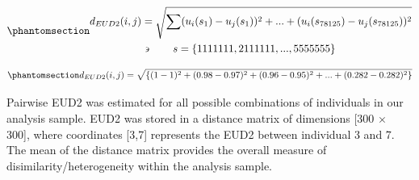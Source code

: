 \documentclass[
  letterpaper,
  DIV=11,
  numbers=noendperiod]{scrartcl}
\begin{document}
\begin{equation}\phantomsection\label{eq-EUD2}{
  \begin{aligned}
    d_{EUD2}(i,j) & =\sqrt{\sum_{}^{}(u_{i}(s_{1})-u_{j}(s_{1}))^{2}+ ... +(u_{i}(s_{78125})-u_{j}(s_{78125}))^{2}}\\
      & \backepsilon \quad \quad s = \{1111111, 2111111, ..., 5555555\}\\
  \end{aligned}
}\end{equation}

\begin{equation}\phantomsection\label{eq-pairwiseEUD2}{
d_{EUD2}(i,j) = \sqrt{\{(1-1)^2+(0.98-0.97)^2+(0.96-0.95)^2+ ... +(0.282-0.282)^2\}}
}\end{equation}

Pairwise EUD2 was estimated for all possible combinations of individuals
in our analysis sample. EUD2 was stored in a distance matrix of
dimensions {[}300 \(\times\) 300{]}, where coordinates {[}3,7{]}
represents the EUD2 between individual 3 and 7. The mean of the distance
matrix provides the overall measure of disimilarity/heterogeneity within
the analysis sample.
\end{document}
